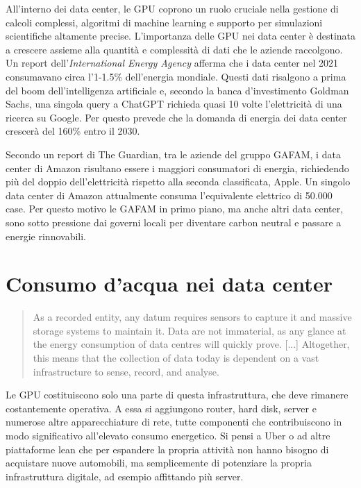 \documentclass[12pt,a4paper,oneside]{book}
\begin{document}
All'interno dei data center, le GPU coprono un ruolo cruciale nella gestione di calcoli complessi, algoritmi di machine learning e supporto per simulazioni scientifiche altamente precise. L'importanza delle GPU nei data center è destinata a crescere assieme alla quantità e complessità di dati che le aziende raccolgono. Un report dell'\textit{International Energy Agency} afferma che i data center nel 2021 consumavano circa l'1-1.5\% dell'energia mondiale. Questi dati risalgono a prima del boom dell'intelligenza artificiale e, secondo la banca d'investimento Goldman Sachs, una singola query a ChatGPT richieda quasi 10 volte l'elettricità di una ricerca su Google. Per questo prevede che la domanda di energia dei data center crescerà del 160\% entro il 2030.

Secondo un report di The Guardian\cite{guardian2024datacenters}, tra le aziende del gruppo GAFAM, i data center di Amazon risultano essere i maggiori consumatori di energia, richiedendo più del doppio dell'elettricità rispetto alla seconda classificata, Apple. Un singolo data center di Amazon attualmente consuma l'equivalente elettrico di 50.000 case. Per questo motivo le GAFAM in primo piano, ma anche altri data center, sono sotto pressione dai governi locali per diventare carbon neutral e passare a energie rinnovabili.

\chapter{Consumo d'acqua nei data center}

\begin{quote}
\small
As a recorded entity, any datum requires sensors to capture it and massive storage systems to maintain it. Data are not immaterial, as any glance at the energy consumption of data centres will quickly prove. [...] Altogether, this means that the collection of data today is dependent on a vast infrastructure to sense, record, and analyse.\citep[p.28]{srnicek2017platform}
\end{quote}

Le GPU costituiscono solo una parte di questa infrastruttura, che deve rimanere costantemente operativa. A essa si aggiungono router, hard disk, server e numerose altre apparecchiature di rete, tutte componenti che contribuiscono in modo significativo all'elevato consumo energetico. Si pensi a Uber o ad altre piattaforme lean che per espandere la propria attività non hanno bisogno di acquistare nuove automobili, ma semplicemente di potenziare la propria infrastruttura digitale, ad esempio affittando più server. \citep[p.31]{srnicek2017platform}
\end{document}
